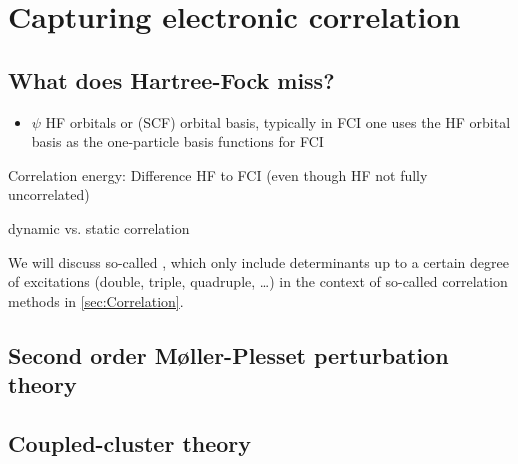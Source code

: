 \section{Capturing electronic correlation}
\label{sec:Correlation}

\subsection{What does Hartree-Fock miss?}







\begin{itemize}
\item
$\psi$ HF orbitals or (SCF) orbital basis,
typically in FCI one uses the HF orbital basis as the one-particle basis functions for FCI
	\end{itemize}



Correlation energy: Difference HF to FCI
(even though HF not fully uncorrelated)

dynamic vs. static correlation


We will discuss so-called ,
which only include determinants up to a certain
degree of excitations (double, triple, quadruple, \ldots)
in the context of so-called correlation methods in \vref{sec:Correlation}.


\subsection{Second order Møller-Plesset perturbation theory}

\subsection{Coupled-cluster theory}

